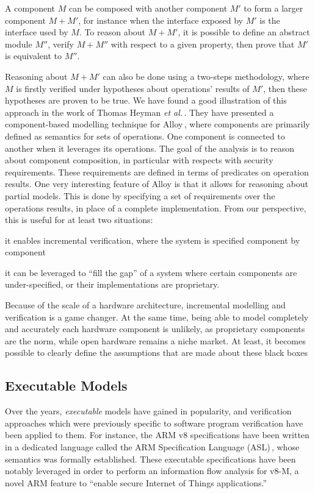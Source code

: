 A component $M$ can be composed with another component $M'$ to form a larger
component $M + M'$, for instance when the interface exposed by $M'$ is the
interface used by $M$.
%
To reason about $M + M'$, it is possible to define an abstract module $M''$,
verify $M + M''$ with respect to a given property, then prove that $M'$ is
equivalent to $M''$.

Reasoning about $M + M'$ can also be done using a two-steps methodology, where
$M$ is firstly verified under hypotheses about operations' results of $M'$, then
these hypotheses are proven to be true.
%
We have found a good illustration of this approach in the work of Thomas Heyman
\emph{et al.}\,\cite{heyman2012securemodel}.
%
They have presented a component-based modelling technique for
Alloy\,\cite{jackson2012alloy}, where components are primarily defined as
semantics for sets of operations.
%
One component is connected to another when it leverages its operations.
%
The goal of the analysis is to reason about component composition, in particular
with respects with security requirements.
%
These requirements are defined in terms of predicates on operation results.
%
One very interesting feature of Alloy is that it allows for reasoning about
partial models.
%
This is done by specifying a set of requirements over the operations results, in
place of a complete implementation.
%
From our perspective, this is useful for at least two situations:
%
\begin{inparaenum}[(1)]
\item it enables incremental verification, where the system is specified
  component by component
%
\item it can be leveraged to ``fill the gap'' of a system where certain
  components are under-specified, or their implementations are proprietary.
%
\end{inparaenum}
%
Because of the scale of a hardware architecture, incremental modelling and
verification is a game changer.
%
At the same time, being able to model completely and accurately each hardware
component is unlikely, as proprietary components are the norm, while open
hardware remains a niche market.
%
At least, it becomes possible to clearly define the assumptions that are made
about these black boxes

\subsection{Executable Models}
\label{subsec:related:ease:exec}
%
Over the years, \emph{executable} models have gained in popularity, and
verification approaches which were previously specific to software program
verification have been applied to them.
%
For instance, the ARM v8 specifications have been written in a dedicated
language called the ARM Specification Language (ASL)\,\cite{reid2016armv8},
whose semantics was formally established.
%
These executable specifications have been notably leveraged in order to perform
an information flow analysis for v8-M, a novel ARM feature to ``enable secure
Internet of Things applications.''

